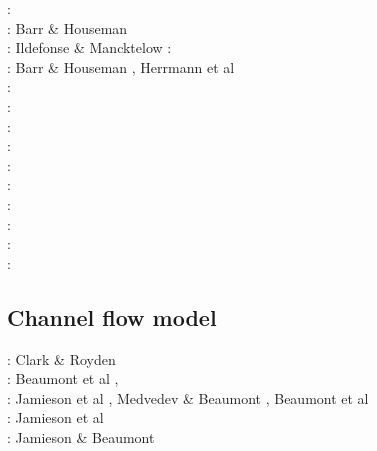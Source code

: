 \begin{scriptsize}
\nineteenseventyone: \cite{stbe71}\\
\nineteenninetytwo: Barr \& Houseman \cite{baho92}\\
\nineteenninetythree: Ildefonse \& Mancktelow \cite{ilma93}
\nineteenninetyfive: \cite{fige95}\\
\nineteenninetysix: Barr \& Houseman \cite{baho96}, Herrmann et al \cite{hept96}\\
\twothousand: \cite{acgf00}\cite{trla00}\\
\twothousandone: \cite{masc01}\\
\twothousandeight: \cite{manc08}\cite{scsf08}\\
\twothousandeleven: \cite{frem11}\\
\twothousandthirteen: \cite{soma13}\cite{lehl13}\\
\twothousandfourteen: \cite{olbm14}\\
\twothousandfifteen: \cite{pevp15}\cite{jalr15}\\
\twothousandseventeen: \cite{naam17}\cite{scdu17}\\
\twothousandeighteen: \cite{naam18}\\
\twothousandnineteen: \cite{llor19}\cite{yada19}\cite{sogh19}
\end{scriptsize}

\subsection{Channel flow model} 

\begin{scriptsize}
\twothousand: Clark \& Royden \cite{clro00}\\
\twothousandfour: Beaumont et al \cite{bejn04}, \cite{jabm04}\\
\twothousandsix: Jamieson et al \cite{jabn06}, Medvedev \& Beaumont \cite{mebe06}, 
                 Beaumont et al \cite{benj06}\\
\twothousandseven: Jamieson et al \cite{jabn07}\\
\twothousandeleven: Jamieson \& Beaumont \cite{jabe11}
\end{scriptsize}

